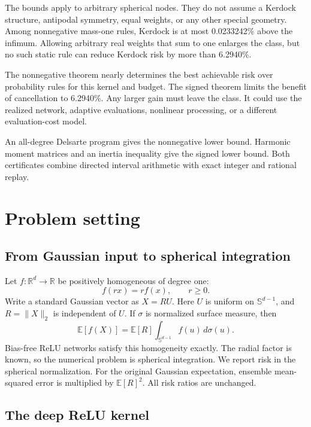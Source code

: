 \documentclass[11pt]{article}
\begin{document}
The bounds apply to arbitrary spherical nodes. They do not assume a
Kerdock structure, antipodal symmetry, equal weights, or any other special
geometry. Among nonnegative mass-one rules, Kerdock is at most
0.0233242\% above the infimum. Allowing arbitrary real weights that sum to
one enlarges the class, but no such static rule can reduce Kerdock risk by
more than 6.2940\%.

The nonnegative theorem nearly determines the best achievable risk over
probability rules for this kernel and budget. The signed theorem limits the
benefit of cancellation to 6.2940\%. Any larger gain must leave the class.
It could use the realized network, adaptive evaluations, nonlinear
processing, or a different evaluation-cost model.

An all-degree Delsarte program gives the nonnegative lower bound. Harmonic
moment matrices and an inertia inequality give the signed lower bound.
Both certificates combine directed interval arithmetic with exact integer
and rational replay.

\section{Problem setting}\label{problem-setting}

\subsection{From Gaussian input to spherical integration}
\label{from-gaussian-input-to-spherical-integration}

Let \(f:\mathbb{R}^d\to\mathbb{R}\) be positively homogeneous of degree
one:
\[
f(rx)=r f(x), \qquad r\geq 0.
\]
Write a standard Gaussian vector as \(X=RU\). Here \(U\) is uniform on
\(\mathbb{S}^{d-1}\), and \(R=\lVert X\rVert_2\) is independent of \(U\).
If \(\sigma\) is normalized surface measure, then
\[
\mathbb{E}[f(X)]
=\mathbb{E}[R]\int_{\mathbb{S}^{d-1}} f(u)\,d\sigma(u).
\]
Bias-free ReLU networks satisfy this homogeneity exactly. The radial
factor is known, so the numerical problem is spherical integration. We
report risk in the spherical normalization. For the original Gaussian
expectation, ensemble mean-squared error is multiplied by
\(\mathbb{E}[R]^2\). All risk ratios are unchanged.

\subsection{The deep ReLU kernel}\label{the-deep-relu-kernel}
\end{document}
